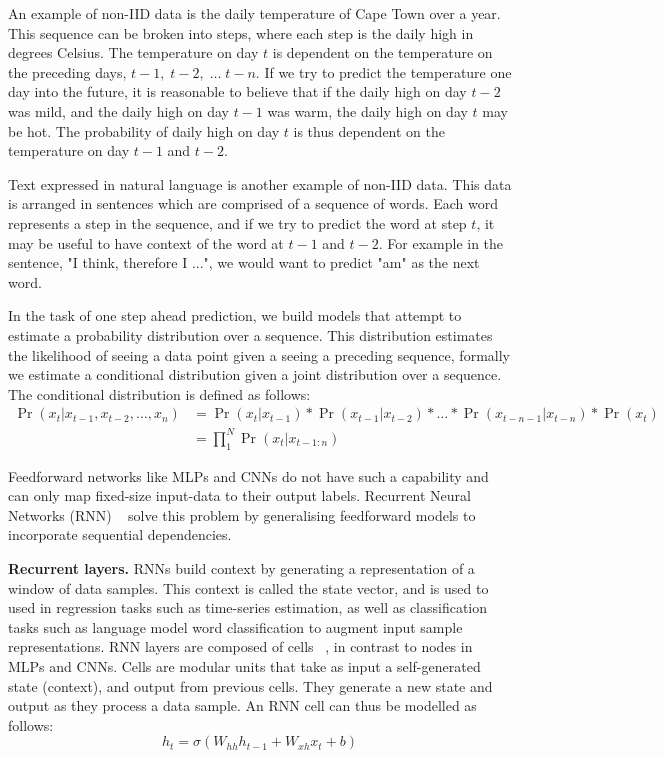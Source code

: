 \noindent An example of non-IID data is the daily temperature of Cape Town over a year. This sequence can be broken into steps, where each step is the daily high in degrees Celsius. The temperature on day $ t $ is dependent on the temperature on the preceding days, $ t - 1, \; t - 2, \; \dots \; t - n $. If we try to predict the temperature one day into the future, it is reasonable to believe that if the daily high on day $ t - 2 $ was mild, and the daily high on day $ t - 1 $ was warm, the daily high on day $ t $ may be hot. The probability of daily high on day $ t $ is thus dependent on the temperature on day $ t - 1$ and $ t - 2$. \par
 
\noindent Text expressed in natural language is another example of non-IID data. This data is arranged in sentences which are comprised of a sequence of words. Each word represents a step in the sequence, and if we try to predict the word at step $ t $, it may be useful to have context of the word at $t -1$ and $t - 2$. For example in the sentence, "I think, therefore I ...", we would want to predict "am" as the next word. \par

\noindent In the task of one step ahead prediction, we build models that attempt to estimate a probability distribution over a sequence. This distribution estimates the likelihood of seeing a data point given a seeing a preceding sequence, formally we estimate a conditional distribution given a joint distribution over a sequence. The conditional distribution is defined as follows:
\begin{equation}
	\begin{split}
		\Pr( x_t | x_{t - 1},  x_{t - 2}, \dots,  x_n ) & = \Pr(x_t | x_{t - 1}) * \Pr(x_{t - 1}| x_{t - 2}) * \dots * \Pr(x_{t - n - 1}| x_{t - n}) * \Pr(x_t) \\
		& =\prod_{1}^N \Pr(x_t | x_{t - 1:n})
	\end{split}
\end{equation}

\noindent Feedforward networks like MLPs and CNNs do not have such a capability and can only map fixed-size input-data to their output labels. Recurrent Neural Networks (RNN) \unskip ~\citep{werbos1988generalization} solve this problem by generalising feedforward models to incorporate sequential dependencies. \par

\noindent \textbf{Recurrent layers.} RNNs build context by generating a representation of a window of data samples. This context is called the state vector, and is used to used in regression tasks such as time-series estimation, as well as classification tasks such as language model word classification to augment input sample representations. RNN layers are composed of cells \unskip ~\citep{DLIndaba2018}, in contrast to nodes in MLPs and CNNs. Cells are modular units that take as input a self-generated state (context), and output from previous cells. They generate a new state and output as they process a data sample. An RNN cell can thus be modelled as follows: 
\begin{equation}
	h_t = \sigma(W_{hh}h_{t-1} + W_{xh}x_t + b)
\end{equation}

